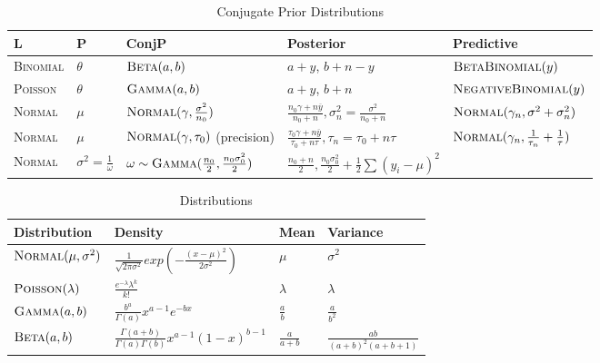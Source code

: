 \begin{table*}[p]
  \caption{Conjugate Prior Distributions}
\begin{tabular}{lllll}
\hline
L & P & ConjP & Posterior & Predictive \\
\hline
\textsc{Binomial} & $\theta$ & $\textsc{Beta}(a, b)$ & $a + y$, $b + n - y$ & $\textsc{BetaBinomial}(y)$ \\
\textsc{Poisson} & $\theta$ & $\textsc{Gamma}(a, b)$ & $a + y$, $b + n$ & $\textsc{NegativeBinomial}(y)$ \\
\textsc{Normal} & $\mu$ & $\textsc{Normal}(\gamma, \frac{\sigma^{2}}{n_{0}})$ & $\frac{n_{0} \gamma + n \overline y}{n_0 + n}, \sigma^{2}_{n} = \frac{\sigma^{2}}{n_{0} + n}$ & $\textsc{Normal}(\gamma_{n}, \sigma^{2} + \sigma^{2}_{n})$ \\
\textsc{Normal} & $\mu$ & $\textsc{Normal}(\gamma, \tau_{0})$ (precision) & $\frac{\tau_{0} \gamma + n \overline y}{\tau_{0} + n \tau}, \tau_{n} = \tau_{0} + n \tau$ & $\textsc{Normal}(\gamma_{n}, \frac{1}{\tau_{n}} + \frac{1}{\tau})$ \\
\textsc{Normal} & $\sigma^{2} = \frac{1}{\omega}$ & $\omega \sim \textsc{Gamma}(\frac{n_{0}}{2}, \frac{n_{0} \sigma_{0}^{2}}{2})$ & $\frac{n_{0} + n}{2}, \frac{n_{0} \sigma_{0}^{2}}{2} + \frac{1}{2} \sum (y_{i} - \mu)^{2}$ &  \\
\hline
\end{tabular}
\end{table*}

\begin{table*}[p]
\caption{Distributions}
\begin{tabular}{llll}
\hline
Distribution & Density & Mean & Variance \\
\hline
$\textsc{Normal}(\mu, \sigma^{2})$ & $\frac{1}{\sqrt{2 \pi \sigma^{2}}} exp(-\frac{(x - \mu)^{2}}{2 \sigma^{2}})$ & $\mu$ & $\sigma^{2}$ \\
$\textsc{Poisson}(\lambda)$ & $\frac{e^{-\lambda} \lambda^{k}}{k!}$ & $\lambda$ & $\lambda$ \\
$\textsc{Gamma}(a, b)$ & $\frac{b^{a}}{\Gamma(a)} x^{a-1} e^{-bx}$ & $\frac{a}{b}$ & $\frac{a}{b^{2}}$ \\
$\textsc{Beta}(a, b)$ & $\frac{\Gamma(a + b)}{\Gamma(a) \Gamma(b)} x^{a-1}(1-x)^{b-1}$ & $\frac{a}{a+b}$ & $\frac{ab}{(a+b)^{2}(a + b + 1)}$ \\
\hline
\end{tabular}
\end{table*}

